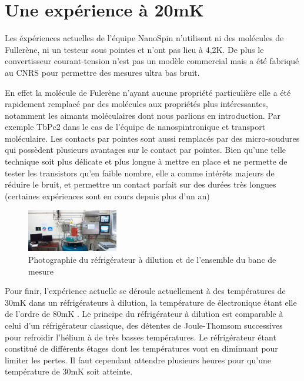 \section{Une expérience à 20mK}
Les éxpériences actuelles de l'équipe NanoSpin n'utilisent ni des molécules de Fullerène, ni un testeur sous pointes et n'ont pas lieu à 4,2K. De plus le convertisseur courant-tension n'est pas un modèle commercial mais a été fabriqué au CNRS pour permettre des mesures ultra bas bruit.

En effet la molécule de Fulerène n'ayant aucune propriété particulière elle a été rapidement remplacé par des molécules aux propriétés plus intéressantes, notamment les aimants moléculaires dont nous parlions en introduction. Par exemple TbPc2 dans le cas de l'équipe de nanospintronique et transport moléculaire.
Les contacts par pointes sont aussi remplacés par des micro-soudures qui possèdent plusieurs avantages sur le contact par pointes. Bien qu'une telle technique soit plus délicate et plus longue à mettre en place et ne permette de tester les transistors qu'en faible nombre, elle a comme intérêts majeurs de réduire le bruit, et permettre un contact parfait sur des durées très longues (certaines expériences sont en cours depuis plus d'un an)

\begin{figure}[h]
    \begin{center}
        \includegraphics[width=150px]{Images/5_Refrigerateur_Dillution.jpg}
        \caption{Photographie du réfrigérateur à dilution et de l'ensemble du banc de mesure}
    \end{center}
\end{figure}

Pour finir, l'expérience actuelle se déroule actuellement à des températures de 30mK dans un réfrigérateurs à dilution, la température de électronique étant elle de l'ordre de 80mK \cite{10}. Le principe du réfrigérateur à dilution est comparable à celui d'un réfrigérateur classique, des détentes de Joule-Thomsom successives pour refroidir l'hélium à de très basses températures. Le réfrigérateur étant constitué de différents étages dont les températures vont en diminuant pour limiter les pertes. Il faut cependant attendre plusieurs heures pour qu'une température de 30mK soit atteinte.

